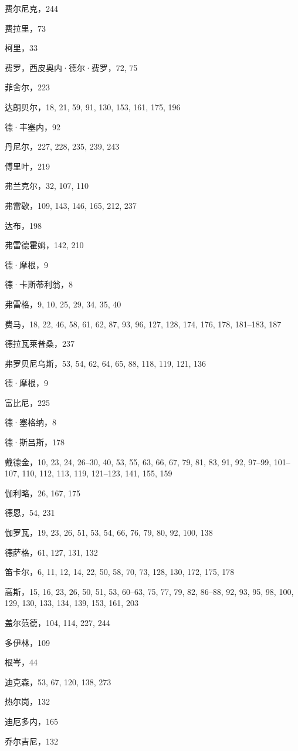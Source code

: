费尔尼克，244

费拉里，73

柯里，33

费罗，西皮奥内·德尔·费罗，72, 75

菲舍尔，223

达朗贝尔，18, 21, 59, 91, 130, 153, 161, 175, 196

德·丰塞内，92

丹尼尔，227, 228, 235, 239, 243

傅里叶，219

弗兰克尔，32, 107, 110

弗雷歇，109, 143, 146, 165, 212, 237

达布，198

弗雷德霍姆，142, 210

德·摩根，9

德·卡斯蒂利翁，8

弗雷格，9, 10, 25, 29, 34, 35, 40

费马，18, 22, 46, 58, 61, 62, 87, 93, 96, 127, 128, 174, 176, 178, 181--183, 187

德拉瓦莱普桑，237

弗罗贝尼乌斯，53, 54, 62, 64, 65, 88, 118, 119, 121, 136

德·摩根，9

富比尼，225

德·塞格纳，8

德·斯吕斯，178

戴德金，10, 23, 24, 26--30, 40, 53, 55, 63, 66, 67, 79, 81, 83, 91, 92, 97--99, 101--107, 110, 112, 113, 119, 121--123, 141, 155, 159

伽利略，26, 167, 175

德恩，54, 231

伽罗瓦，19, 23, 26, 51, 53, 54, 66, 76, 79, 80, 92, 100, 138

德萨格，61, 127, 131, 132

笛卡尔，6, 11, 12, 14, 22, 50, 58, 70, 73, 128, 130, 172, 175, 178

高斯，15, 16, 23, 26, 50, 51, 53, 60--63, 75, 77, 79, 82, 86--88, 92, 93, 95, 98, 100, 129, 130, 133, 134, 139, 153, 161, 203

盖尔范德，104, 114, 227, 244

多伊林，109

根岑，44

迪克森，53, 67, 120, 138, 273

热尔岗，132

迪厄多内，165

乔尔吉尼，132

